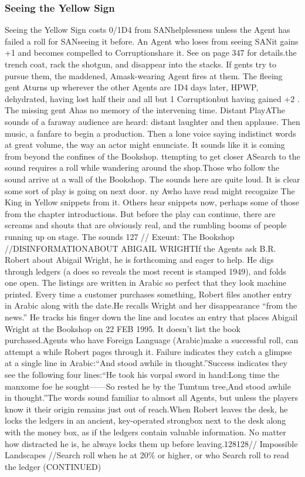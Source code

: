 \documentclass{report}
\begin{document}
\begin{multicols}{2}
\subsubsection{Seeing the Yellow Sign}
Seeing the Yellow Sign costs 0/1D4  from SANhelplessness unless the Agent has failed a  roll for SANseeing it before. An Agent who loses  from seeing SANit gains +1 and becomes compelled to  Corruptionshare it.  See   on page 347 for details.the trench coat, rack the shotgun, and disappear into the stacks. If gents try to pursue them, the maddened, Amask-wearing Agent fires at them. The fleeing gent Aturns up wherever the other Agents are 1D4 days later, HPWP, dehydrated, having lost half their  and all but 1 Corruptionbut having gained +2 . The missing gent Ahas no memory of the intervening time. Distant PlayAThe sounds of a faraway audience are heard: distant laughter and then applause. Then music, a fanfare to begin a production. Then a lone voice saying indistinct words at great volume, the way an actor might enunciate. It sounds like it is coming from beyond the confines of the Bookshop. ttempting to get closer ASearch to the sound requires a roll while wandering around the shop.Those who follow the sound arrive at a wall of the Bookshop. The sounds here are quite loud. It is clear some sort of play is going on next door. ny Awho have read might recognize The King in Yellow snippets from it. Others hear snippets now, perhaps some of those from the chapter introductions. But before the play can continue, there are screams and shouts that are obviously real, and the rumbling booms of people running up on stage. The sounds 127\newpage
// Exeunt: The Bookshop //DISINFORMATIONABOUT ABIGAIL WRIGHTIf the Agents ask B.R. Robert about Abigail Wright, he is forthcoming and eager to help. He digs through ledgers (a does so reveals the most recent is stamped 1949), and folds one open. The listings are written in Arabic so perfect that they look machine printed. Every time a customer purchases something, Robert files another entry in Arabic along with the date.He recalls Wright and her disappearance “from the news.” He tracks his finger down the line and locates an entry that places Abigail Wright at the Bookshop on 22 FEB 1995. It doesn't list the book purchased.Agents who have Foreign Language (Arabic)make a successful roll, can attempt a while Robert pages through it. Failure indicates they catch a glimpse at a single line in Arabic:“And stood awhile in thought.”Success indicates they see the following four lines:“He took his vorpal sword in hand:Long time the manxome foe he sought——So rested he by the Tumtum tree,And stood awhile in thought.”The words sound familiar to almost all Agents, but unless the players know it their origin remains just out of reach.When Robert leaves the desk, he locks the ledgers in an ancient, key-operated strongbox next to the desk along with the money box, as if the ledgers contain valuable information. No matter how distracted he is, he always locks them up before leaving.128128// Impossible Landscapes //Search roll when he  at 20\% or higher, or who Search roll to read the ledger (CONTINUED)\newpage

\end{multicols}
\end{document}
